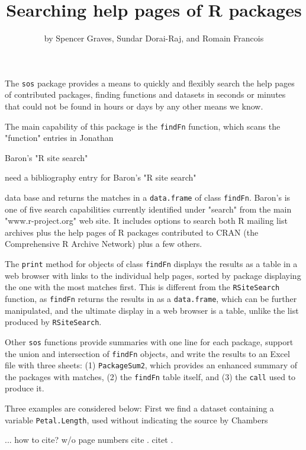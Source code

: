\title{Searching help pages of R packages}
\author{by Spencer Graves, Sundar Dorai-Raj, and Romain Francois}

\maketitle

The {\tt sos} package provides a means to quickly and flexibly
search the help pages of contributed packages, finding
functions and datasets in seconds or minutes that could not be
found in hours or days by any other means we know.

The main capability of this package is the {\tt findFn} function,
which scans the "function" entries in Jonathan

Baron's "R site search"

need a bibliography entry for Baron's "R site search"

data base and returns the matches in a
{\tt data.frame} of class {\tt findFn}.  Baron's is one of five
search capabilities currently identified under "search" from the
main "www.r-project.org" web site.  It includes options to
search both R mailing list archives plus the help pages of
R packages contributed to CRAN (the Comprehensive R Archive
Network) plus a few others.

The {\tt print} method for objects of class {\tt findFn}
displays the results as a table in a web
browser with links to the individual help pages, sorted by package
displaying the one with the most matches first.  This is different
from the {\tt RSiteSearch} function, as {\tt findFn} returns
the results in \R{} as a {\tt data.frame}, which can be further
manipulated, and the ultimate display in a web browser is a
table, unlike the list produced by {\tt RSiteSearch}.

Other {\tt sos} functions provide summaries with one line for each
package, support the union and intersection of {\tt findFn} objects,
and write the results to an Excel file with three sheets:  (1)
{\tt PackageSum2}, which provides an enhanced summary of the packages
with matches, (2) the {\tt findFn} table itself, and (3) the {\tt call}
used to produce it.

Three examples are considered below:  First we find a dataset
containing a variable {\tt Petal.Length}, used without indicating
the source by Chambers

... how to cite?
w/o page numbers
cite \cite{JC09}.
citet \citet{JC09}.

